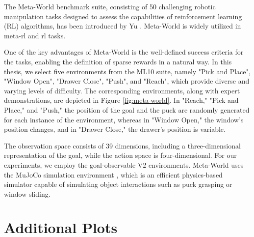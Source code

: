   


The Meta-World benchmark suite, consisting of 50 challenging robotic manipulation tasks designed to assess the capabilities of reinforcement learning (RL) algorithms, 
has been introduced by Yu \etAl \cite{yu2019meta}. Meta-World is widely utilized in meta-\ac{rl} and \ac{rl} tasks.

One of the key advantages of Meta-World is the well-defined success criteria for the tasks, enabling the definition of sparse rewards in a natural way. 
In this thesis, we select five environments from the ML10 suite, namely "Pick and Place", "Window Open", "Drawer Close", "Push", and "Reach", which provide diverse and varying levels of 
difficulty. The corresponding environments, along with expert demonstrations, are depicted in Figure \ref{fig:meta-world}. In "Reach," "Pick and Place," and "Push," the position of the goal 
and the puck are randomly generated for each instance of the environment, whereas in "Window Open," the window's position changes, and in "Drawer Close," the drawer's position is variable.

The observation space consists of 39 dimensions, including a three-dimensional representation of the goal, while the action space is four-dimensional. For our experiments, 
we employ the goal-observable V2 environments. Meta-World uses the MuJoCo simulation environment \cite{todorov2012mujoco}, which is an efficient physics-based 
simulator capable of simulating object interactions such as puck grasping or window sliding.

\chapter{Additional Plots}
\label{chapter:additional_plots}

